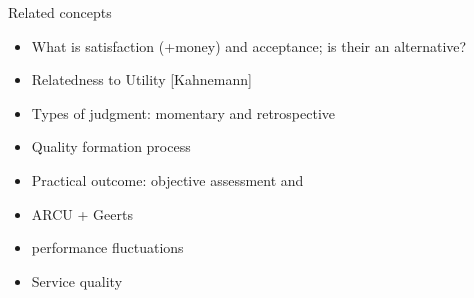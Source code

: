 Related concepts
\begin{itemize}
\item What is satisfaction (+money) and acceptance; is their an alternative?
\item Relatedness to Utility [Kahnemann]

\item Types of judgment: momentary and retrospective
\item Quality formation process

\item Practical outcome: objective assessment and 

\item ARCU + Geerts
\item performance fluctuations
\item Service quality
\end{itemize}